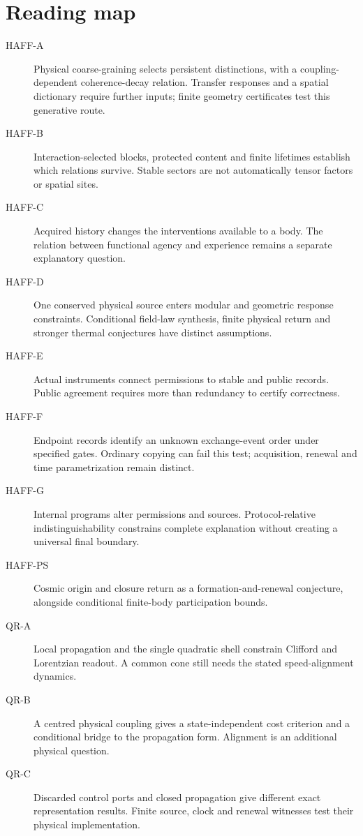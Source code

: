 \documentclass[11pt,a4paper]{article}
\begin{document}
\section*{Reading map}
\begin{description}
\item[HAFF-A] Physical coarse-graining selects persistent distinctions, with a coupling-dependent coherence-decay relation. Transfer responses and a spatial dictionary require further inputs; finite geometry certificates test this generative route.
\item[HAFF-B] Interaction-selected blocks, protected content and finite lifetimes establish which relations survive. Stable sectors are not automatically tensor factors or spatial sites.
\item[HAFF-C] Acquired history changes the interventions available to a body. The relation between functional agency and experience remains a separate explanatory question.
\item[HAFF-D] One conserved physical source enters modular and geometric response constraints. Conditional field-law synthesis, finite physical return and stronger thermal conjectures have distinct assumptions.
\item[HAFF-E] Actual instruments connect permissions to stable and public records. Public agreement requires more than redundancy to certify correctness.
\item[HAFF-F] Endpoint records identify an unknown exchange-event order under specified gates. Ordinary copying can fail this test; acquisition, renewal and time parametrization remain distinct.
\item[HAFF-G] Internal programs alter permissions and sources. Protocol-relative indistinguishability constrains complete explanation without creating a universal final boundary.
\item[HAFF-PS] Cosmic origin and closure return as a formation-and-renewal conjecture, alongside conditional finite-body participation bounds.
\item[QR-A] Local propagation and the single quadratic shell constrain Clifford and Lorentzian readout. A common cone still needs the stated speed-alignment dynamics.
\item[QR-B] A centred physical coupling gives a state-independent cost criterion and a conditional bridge to the propagation form. Alignment is an additional physical question.
\item[QR-C] Discarded control ports and closed propagation give different exact representation results. Finite source, clock and renewal witnesses test their physical implementation.

\end{description}
\end{document}

